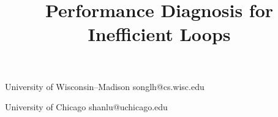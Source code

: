 \documentclass[10pt]{sigplanconf}
\begin{document}
\title{
  Performance Diagnosis for Inefficient Loops
}



           {University of Wisconsin--Madison}
           {songlh@cs.wisc.edu}

           {University of Chicago}
           {shanlu@uchicago.edu}

\maketitle
\begin{abstract}

\end{abstract}









%
%


\balance
{

 
}
\end{document}

